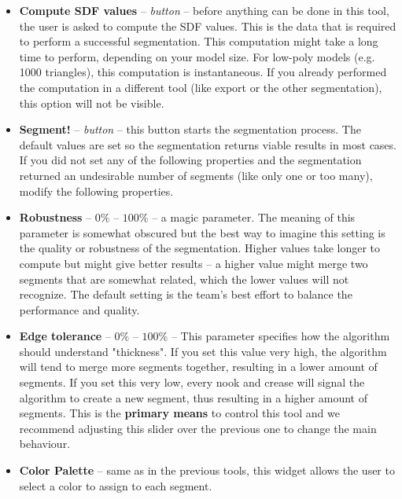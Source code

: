 \begin{itemize}

\item \textbf{Compute SDF values} -- \textit{button} -- before anything can be done in this tool, the user is asked to compute the SDF values. This is the data that is required to perform a successful segmentation. This computation might take a long time to perform, depending on your model size. For low-poly models (e.g. 1000 triangles), this computation is instantaneous. If you already performed the computation in a different tool (like export or the other segmentation), this option will not be visible.

\item \textbf{Segment!} -- \textit{button} -- this button starts the segmentation process. The default values are set so the segmentation returns viable results in most cases. If you did not set any of the following properties and the segmentation returned an undesirable number of segments (like only one or too many), modify the following properties.

\item \textbf{Robustness} -- $0\%$ -- $100\%$ -- a magic parameter. The meaning of this parameter is somewhat obscured but the best way to imagine this setting is the quality or robustness of the segmentation. Higher values take longer to compute but might give better results -- a higher value might merge two segments that are somewhat related, which the lower values will not recognize. The default setting is the team's best effort to balance the performance and quality.

\item \textbf{Edge tolerance} -- $0\%$ -- $100\%$ -- This parameter specifies how the algorithm should understand "thickness". If you set this value very high, the algorithm will tend to merge more segments together, resulting in a lower amount of segments. If you set this very low, every nook and crease will signal the algorithm to create a new segment, thus resulting in a higher amount of segments. This is the \textbf{primary means} to control this tool and we recommend adjusting this slider over the previous one to change the main behaviour.

\item \textbf{Color Palette} -- same as in the previous tools, this widget allows the user to select a color to assign to each segment.


\end{itemize}

